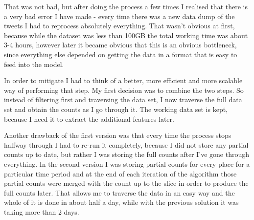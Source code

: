 \documentclass[minf,frontabs,twoside,singlespacing,parskip]{infthesis}
\begin{document}
That was not bad, but after doing the process a few times I realised that there is a very bad error I have made - every time there was a new data dump of the tweets I had to reprocess absolutely everything. That wasn't obvious at first, because while the dataset was less than 100GB the total working time was about 3-4 hours, however later it became obvious that this is an obvious bottleneck, since everything else depended on getting the data in a format that is easy to feed into the model.

In order to mitigate I had to think of a better, more efficient and more scalable way of performing that step. My first decision was to combine the two steps. So instead of filtering first and traversing the data set, I now traverse the full data set and obtain the counts as I go through it. The working data set is kept, because I need it to extract the additional features later. 


Another drawback of the first version was that every time the process stops halfway through I had to re-run it completely, because I did not store any partial counts up to date, but rather I was storing the full counts after I've gone through everything. In the second version I was storing partial counts for every place for a particular time period and at the end of each iteration of the algorithm those partial counts were merged with the count up to the slice in order to produce the full counts later. That allows me to traverse the data in an easy way and the whole of it is done in about half a day, while with the previous solution it was taking more than 2 days.
\end{document}
